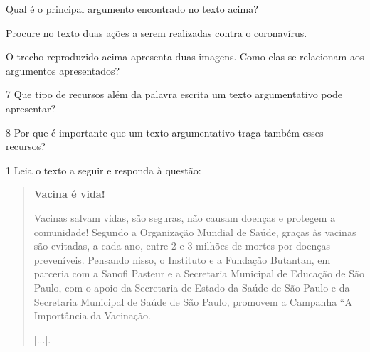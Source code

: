 \begin{escolha}
\item Qual é o principal argumento encontrado no texto acima?



\item Procure no texto duas ações a serem realizadas contra o
coronavírus.



\item O trecho reproduzido acima apresenta duas imagens. Como elas se
relacionam aos argumentos apresentados?

\end{escolha}

\num{7} Que tipo de recursos além da palavra escrita um texto argumentativo
pode apresentar?



\num{8} Por que é importante que um texto argumentativo traga também esses recursos?




\num{1} Leia o texto a seguir e responda à questão:

\begin{quote}
\textbf{Vacina é vida!}

Vacinas salvam vidas, são seguras, não causam doenças e protegem a
comunidade! Segundo a Organização Mundial de Saúde, graças às vacinas
são evitadas, a cada ano, entre 2 e 3 milhões de mortes por doenças
preveníveis. Pensando nisso, o Instituto e a Fundação Butantan, em
parceria com a Sanofi Pasteur e a Secretaria Municipal de Educação de
São Paulo, com o apoio da Secretaria de Estado da Saúde de São Paulo e
da Secretaria Municipal de Saúde de São Paulo, promovem a Campanha ``A
Importância da Vacinação.

{[}...{]}.

\end{quote}

